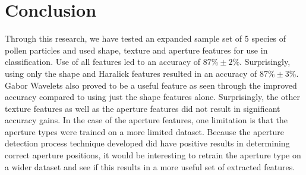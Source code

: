 \section{Conclusion}

Through this research, we have tested an expanded sample set of 5 species of pollen particles and used shape, texture and aperture features for use in classification. Use of all features led to an accuracy of $87\% \pm 2\%$. Surprisingly, using only the shape and Haralick features resulted in an accuracy of $87\% \pm 3\%$. Gabor Wavelets also proved to be a useful feature as seen through the improved accuracy compared to using just the shape features alone. Surprisingly, the other texture features as well as the aperture features did not result in significant accuracy gains. In the case of the aperture features, one limitation is that the aperture types were trained on a more limited dataset. Because the aperture detection process technique developed did have positive results in determining correct aperture positions, it would be interesting to retrain the aperture type on a wider dataset and see if this results in a more useful set of extracted features. 
    
  
  
  
